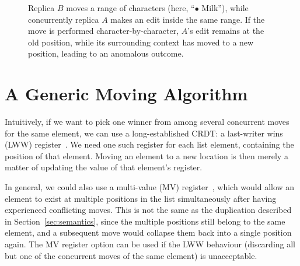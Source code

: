 \documentclass[sigplan,10pt]{acmart}
\begin{document}
\begin{figure}
    \caption{Replica $B$ moves a range of characters (here, ``$\bullet$ Milk''), while concurrently replica $A$ makes an edit inside the same range. If the move is performed character-by-character, $A$'s edit remains at the old position, while its surrounding context has moved to a new position, leading to an anomalous outcome.}
    \label{fig:range-bad}
\end{figure}

\section{A Generic Moving Algorithm}\label{sec:algorithm}

Intuitively, if we want to pick one winner from among several concurrent moves for the same element, we can use a long-established CRDT: a last-writer wins (LWW) register~\cite{Shapiro:2011wy,Johnson:1975we}.
We need one such register for each list element, containing the position of that element.
Moving an element to a new location is then merely a matter of updating the value of that element's register.

In general, we could also use a multi-value (MV) register~\cite{Shapiro:2011wy}, which would allow an element to exist at multiple positions in the list simultaneously after having experienced conflicting moves.
This is not the same as the duplication described in Section~\ref{sec:semantics}, since the multiple positions still belong to the same element, and a subsequent move would collapse them back into a single position again.
The MV register option can be used if the LWW behaviour (discarding all but one of the concurrent moves of the same element) is unacceptable.
\end{document}
